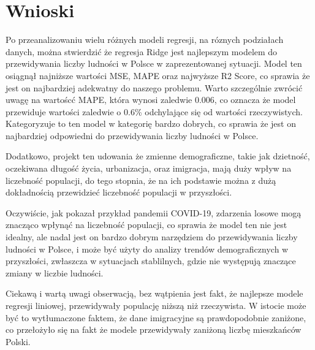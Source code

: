 \documentclass[11pt]{article}
\begin{document}
\section{Wnioski}
Po przeanalizowaniu wielu różnych modeli regresji, na róznych podziałach danych, można stwierdzić że regresja Ridge jest najlepszym modelem do przewidywania liczby ludności w Polsce w zaprezentowanej sytuacji.
Model ten osiągnął najniższe wartości MSE, MAPE oraz najwyższe R2 Score, co sprawia że jest on najbardziej adekwatny do naszego problemu.
Warto szczególnie zwrócić uwagę na wartoścć MAPE, która wynosi zaledwie 0.006, co oznacza że model przewiduje wartości zaledwie o 0.6\% odchylające się od wartości rzeczywistych.
Kategoryzuje to ten model w kategorię bardzo dobrych\cite{rg}, co sprawia że jest on najbardziej odpowiedni do przewidywania liczby ludności w Polsce.\par
Dodatkowo, projekt ten udowania że zmienne demograficzne, takie jak dzietność, oczekiwana długość życia, urbanizacja, oraz imigracja, mają duży wpływ na liczebność populacji,
do tego stopnia, że na ich podstawie można z dużą dokładnością przewidzieć liczebność populacji w przyszłości.\par
Oczywiście, jak pokazał przykład pandemii COVID-19, zdarzenia losowe mogą znacząco wpłynąć na liczebność populacji, co sprawia że model ten nie jest idealny, ale nadal jest on bardzo dobrym narzędziem do przewidywania liczby ludności w Polsce,
i może być użyty do analizy trendów demograficznych w przyszłości, zwłaszcza w sytuacjach stablilnych, gdzie nie występują znaczące zmiany w liczbie ludności.\par
Ciekawą i wartą uwagi obserwacją, bez wątpienia jest fakt, że najlepsze modele regresji liniowej, przewidywały populację niższą niż rzeczywista.
W istocie może być to wytłumaczone faktem, że dane imigracyjne są prawdopodobnie zaniżone, co przełożyło się na fakt że modele przewidywały zaniżoną liczbę mieszkańców Polski.


\end{document}

